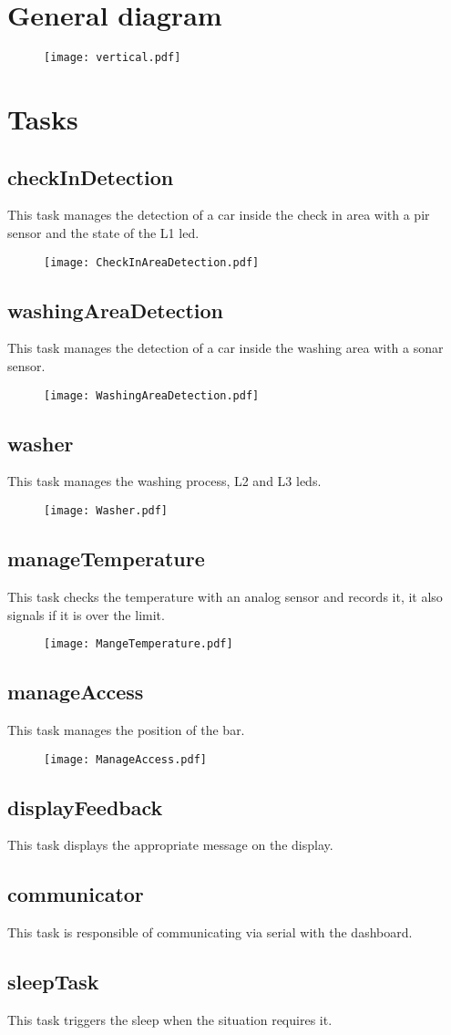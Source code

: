 \pagebreak
\section{General diagram}
\begin{figure}[H]
    \centering
    \texttt{[image: vertical.pdf]}
\end{figure}
\pagebreak
\section{Tasks}
\subsection{checkInDetection}
This task manages the detection of a car inside the check in area with a pir sensor and the state of the L1 led.
\begin{figure}[H]
    \centering
    \texttt{[image: CheckInAreaDetection.pdf]}
\end{figure}
\subsection{washingAreaDetection}
This task manages the detection of a car inside the washing area with a sonar sensor.
\begin{figure}[H]
    \centering
\texttt{[image: WashingAreaDetection.pdf]}
\end{figure}
\subsection{washer}
This task manages the washing process, L2 and L3 leds.
\begin{figure}[H]
    \centering
\texttt{[image: Washer.pdf]}
\end{figure}
\subsection{manageTemperature}
This task checks the temperature with an analog sensor and records it, it also signals if it is over the limit.
\begin{figure}[H]
    \centering
\texttt{[image: MangeTemperature.pdf]}
\end{figure}
\subsection{manageAccess}
This task manages the position of the bar.
\begin{figure}[H]
    \centering
\texttt{[image: ManageAccess.pdf]}
\end{figure}
\subsection{displayFeedback}
This task displays the appropriate message on the display.
\subsection{communicator}
This task is responsible of communicating via serial with the dashboard.
\subsection{sleepTask}
This task triggers the sleep when the situation requires it.

